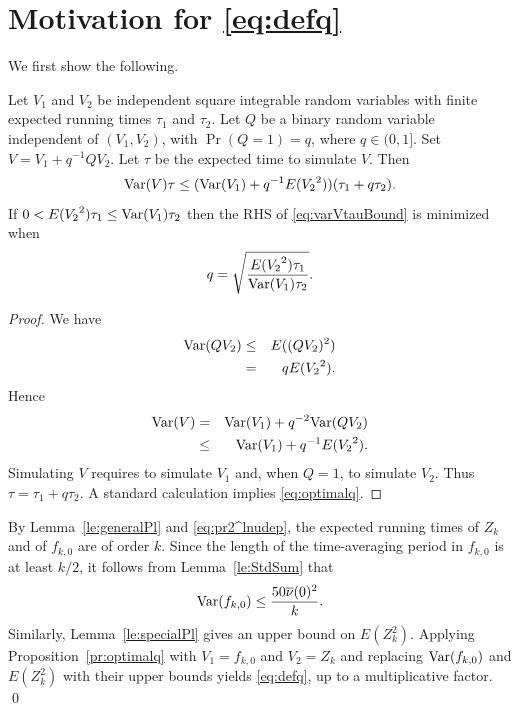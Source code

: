 \documentclass[a4paper,11pt]{article}
\begin{document}
\section{Motivation for \eqref{eq:defq}}\label{se:motivationforq}
We first show the following.
\begin{proposition}\label{pr:optimalq}
Let \(V_{1}\) and \(V_{2}\) be independent square integrable random variables with finite expected running times \(\tau_{1}\) and \(\tau_{2}\). Let \(Q\) be a binary random variable independent of \((V_{1},V_{2})\), with \(\Pr(Q=1)=q\), where \(q\in(0,1]\). Set \(V=V_{1}+q^{-1}QV_{2}\). Let \(\tau\) be the expected  time to simulate \(V\). Then\begin{equation}\label{eq:varVtauBound}
{\rm Var}(V)\tau\le({\rm Var}(V_{1})+q^{-1}E({V_{2}}^{2}))(\tau_{1}+q\tau_{2}).
\end{equation} If  \(0<E({V_{2}}^{2})\tau_{1}\le{\rm Var}(V_{1})\tau_{2}\) then the RHS of \eqref{eq:varVtauBound} is minimized when \begin{equation}\label{eq:optimalq}
q=\sqrt{\frac{E({V_{2}}^{2})\tau_{1}}{{\rm Var}(V_{1})\tau_{2}}}.
\end{equation}
\end{proposition}
\begin{proof}
We have\begin{eqnarray*}
{\rm Var}(QV_{2})&\le&E((Q{V_{2}})^{2})\\&=& qE({V_{2}}^{2}).
\end{eqnarray*}
Hence
\begin{eqnarray}\label{eq:varV}
{\rm Var}(V)&=&{\rm Var}(V_{1})+q^{-2}{\rm Var}(QV_{2})\nonumber\\
&\le&{\rm Var}(V_{1})+q^{-1}E({V_{2}}^{2}).
\end{eqnarray}
Simulating \(V\) requires to simulate \(V_{1}\) and, when \(Q=1\), to simulate \(V_{2}\). Thus \(\tau=\tau_{1}+q\tau_{2}\). A standard calculation implies \eqref{eq:optimalq}.\end{proof}By Lemma~\ref{le:generalPl} and \eqref{eq:pr2^lnudep}, the expected running times of \(Z_{k}\) and of \(f_{k,0}\) are  of order \(k\). Since the length of the time-averaging period in  \(f_{k,0}\) is at least \(k/2\), it follows from Lemma~\ref{le:StdSum} that \begin{equation*}
{\rm Var}(f_{k,0})\leq\frac{50\overline{\nu}(0)^{2}}{k}.
\end{equation*}Similarly, Lemma~\ref{le:specialPl} gives an upper bound on  \(E(Z_{k}^{2})\). Applying Proposition~\ref{pr:optimalq} with \(V_{1}=f_{k,0}\) and \(V_{2}=Z_{k}\) and replacing \({\rm Var}(f_{k,0})\) and \(E(Z_{k}^{2})\) with their upper bounds yields \eqref{eq:defq}, up to a multiplicative factor. \qed    
\end{document}

